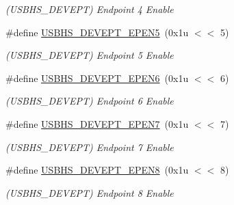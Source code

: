 \begin{DoxyCompactItemize}
\begin{DoxyCompactList}\small\item\em (U\+S\+B\+H\+S\+\_\+\+D\+E\+V\+E\+PT) Endpoint 4 Enable \end{DoxyCompactList}\item 
\mbox{\label{group__SAMV71__USBHS_ga129a8c5968a36f6a8c95fe96a9ba69bb}} 
\#define \mbox{\hyperlink{group__SAMV71__USBHS_ga129a8c5968a36f6a8c95fe96a9ba69bb}{U\+S\+B\+H\+S\+\_\+\+D\+E\+V\+E\+P\+T\+\_\+\+E\+P\+E\+N5}}~(0x1u $<$$<$ 5)
\begin{DoxyCompactList}\small\item\em (U\+S\+B\+H\+S\+\_\+\+D\+E\+V\+E\+PT) Endpoint 5 Enable \end{DoxyCompactList}\item 
\mbox{\label{group__SAMV71__USBHS_gaf558bdac0b92e81eb1efa72b184c9fbb}} 
\#define \mbox{\hyperlink{group__SAMV71__USBHS_gaf558bdac0b92e81eb1efa72b184c9fbb}{U\+S\+B\+H\+S\+\_\+\+D\+E\+V\+E\+P\+T\+\_\+\+E\+P\+E\+N6}}~(0x1u $<$$<$ 6)
\begin{DoxyCompactList}\small\item\em (U\+S\+B\+H\+S\+\_\+\+D\+E\+V\+E\+PT) Endpoint 6 Enable \end{DoxyCompactList}\item 
\mbox{\label{group__SAMV71__USBHS_gab90a8c74e8571613e2e42b2058569e12}} 
\#define \mbox{\hyperlink{group__SAMV71__USBHS_gab90a8c74e8571613e2e42b2058569e12}{U\+S\+B\+H\+S\+\_\+\+D\+E\+V\+E\+P\+T\+\_\+\+E\+P\+E\+N7}}~(0x1u $<$$<$ 7)
\begin{DoxyCompactList}\small\item\em (U\+S\+B\+H\+S\+\_\+\+D\+E\+V\+E\+PT) Endpoint 7 Enable \end{DoxyCompactList}\item 
\mbox{\label{group__SAMV71__USBHS_ga3a373963e79552b55d5c58576acd26e8}} 
\#define \mbox{\hyperlink{group__SAMV71__USBHS_ga3a373963e79552b55d5c58576acd26e8}{U\+S\+B\+H\+S\+\_\+\+D\+E\+V\+E\+P\+T\+\_\+\+E\+P\+E\+N8}}~(0x1u $<$$<$ 8)
\begin{DoxyCompactList}\small\item\em (U\+S\+B\+H\+S\+\_\+\+D\+E\+V\+E\+PT) Endpoint 8 Enable \end{DoxyCompactList}\item 

\end{DoxyCompactItemize}
